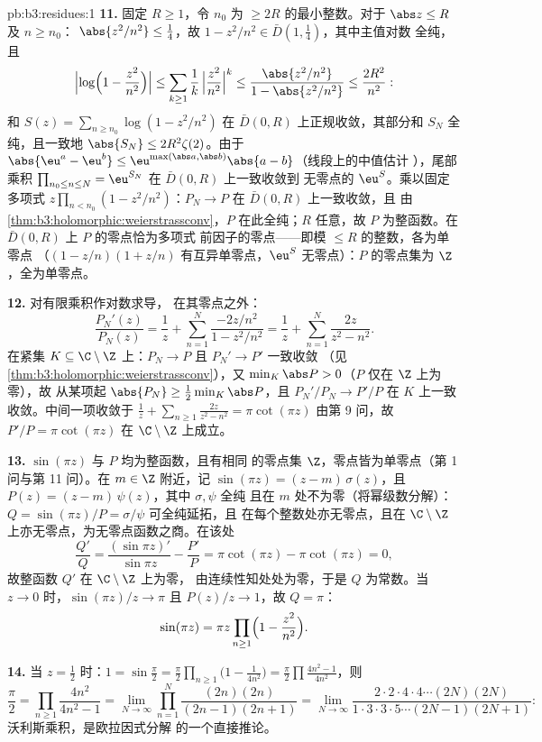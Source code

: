 \begin{solution}{pb:b3:residues:1}
\textbf{11.} 固定 $R \geq 1$，令 $n_0$ 为
$\geq 2R$ 的最小整数。对于 $\abs z \leq R$ 及 $n \geq n_0$：
$\abs{z^2/n^2} \leq \frac14$，故 $1 - z^2/n^2 \in
\bar D(1, \frac14)$，其中主值对数
全纯，且
\[
\Bigl|\log\Bigl(1 - \frac{z^2}{n^2}\Bigr)\Bigr|
\leq \sum_{k\geq1}\frac1k\,\Bigl|\frac{z^2}{n^2}\Bigr|^k
\leq \frac{\abs{z^2/n^2}}{1 - \abs{z^2/n^2}}
\leq \frac{2R^2}{n^2} :
\]
和 $S(z) = \sum_{n\geq n_0}\log(1 - z^2/n^2)$ 在
$\bar D(0, R)$ 上正规收敛，其部分和
$S_N$ 全纯，且一致地 $\abs{S_N} \leq 2R^2\zeta(2)$。由于
$\abs{\eu^a - \eu^b} \leq
\eu^{\max(\abs a,\abs b)}\abs{a - b}$（线段上的中值估计
），尾部乘积 $\prod_{n_0\leq n\leq N} =
\eu^{S_N}$ 在 $\bar D(0, R)$ 上一致收敛到
无零点的 $\eu^S$。乘以固定多项式
$z\prod_{n<n_0}(1 - z^2/n^2)$：$P_N \to P$ 在
$\bar D(0, R)$ 上一致收敛，且
由\cref{thm:b3:holomorphic:weierstrassconv}，$P$
在此全纯；$R$ 任意，故 $P$ 为整函数。在
$\bar D(0, R)$ 上 $P$ 的零点恰为多项式
前因子的零点——即模 $\leq R$ 的整数，各为单零点
（$(1 - z/n)(1 + z/n)$ 有互异单零点，$\eu^S$
无零点）：$P$ 的零点集为 $\Z$，全为单零点。

\textbf{12.} 对有限乘积作对数求导，
在其零点之外：
\[
\frac{P_N'(z)}{P_N(z)} = \frac1z +
\sum_{n=1}^{N}\frac{-2z/n^2}{1 - z^2/n^2}
= \frac1z + \sum_{n=1}^{N}\frac{2z}{z^2 - n^2} .
\]
在紧集 $K \subseteq \C\setminus\Z$ 上：$P_N \to P$ 且
$P_N' \to P'$ 一致收敛
（见\cref{thm:b3:holomorphic:weierstrassconv}），又 $\min_K
\abs P > 0$（$P$ 仅在 $\Z$ 上为零），故
从某项起 $\abs{P_N} \geq \frac12\min_K\abs P$，且 $P_N'/P_N \to
P'/P$ 在 $K$ 上一致收敛。中间一项收敛于
$\frac1z + \sum_{n\geq1}\frac{2z}{z^2-n^2} = \pi\cot(\pi z)$
由第 9 问，故 $P'/P = \pi\cot(\pi z)$ 在
$\C\setminus\Z$ 上成立。

\textbf{13.} $\sin(\pi z)$ 与 $P$ 均为整函数，且有相同
的零点集 $\Z$，零点皆为单零点（第 1 问与第 11 问）。在
$m \in \Z$ 附近，记 $\sin(\pi z) = (z - m)\,\sigma(z)$，且
$P(z) = (z - m)\,\psi(z)$，其中 $\sigma, \psi$ 全纯
且在 $m$ 处不为零（将幂级数分解）：$Q =
\sin(\pi z)/P = \sigma/\psi$ 可全纯延拓，且
在每个整数处亦无零点，且在
$\C\setminus\Z$ 上亦无零点，为无零点函数之商。在该处
\[
\frac{Q'}{Q} = \frac{(\sin\pi z)'}{\sin\pi z} -
\frac{P'}{P} = \pi\cot(\pi z) - \pi\cot(\pi z) = 0 ,
\]
故整函数 $Q'$ 在 $\C\setminus\Z$ 上为零，
由连续性知处处为零，于是 $Q$ 为常数。当 $z \to
0$ 时，$\sin(\pi z)/z \to \pi$ 且 $P(z)/z \to 1$，故 $Q =
\pi$：
\[
\sin(\pi z) = \pi z\prod_{n\geq1}
\Bigl(1 - \frac{z^2}{n^2}\Bigr) .
\]

\textbf{14.} 当 $z = \frac12$ 时：$1 = \sin\frac\pi2 =
\frac\pi2\prod_{n\geq1}\bigl(1 - \frac1{4n^2}\bigr) =
\frac\pi2\prod\frac{4n^2-1}{4n^2}$，则
\[
\frac\pi2 = \prod_{n\geq1}\frac{4n^2}{4n^2 - 1}
= \lim_{N\to\infty}\prod_{n=1}^N
\frac{(2n)(2n)}{(2n-1)(2n+1)}
= \lim_{N\to\infty}
\frac{2\cdot2\cdot4\cdot4\cdots(2N)(2N)}
{1\cdot3\cdot3\cdot5\cdots(2N-1)(2N+1)} :
\]
沃利斯乘积，是欧拉因式分解
的一个直接推论。


\end{solution}
